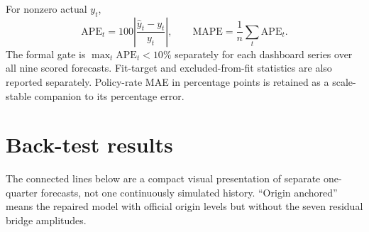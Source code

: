 \documentclass[10pt]{article}
\begin{document}
For nonzero actual \(y_t\),
\[
\mathrm{APE}_t=100\left|\frac{\widehat y_t-y_t}{y_t}\right|,
\qquad
\mathrm{MAPE}=\frac{1}{n}\sum_t\mathrm{APE}_t.
\]
The formal gate is \(\max_t\mathrm{APE}_t<10\%\) separately for each dashboard
series over all nine scored forecasts. Fit-target and excluded-from-fit
statistics are also reported separately. Policy-rate MAE in percentage points
is retained as a scale-stable companion to its percentage error.

\section{Back-test results}

The connected lines below are a compact visual presentation of separate
one-quarter forecasts, not one continuously simulated history. ``Origin
anchored'' means the repaired model with official origin levels but without
the seven residual bridge amplitudes.
\end{document}
